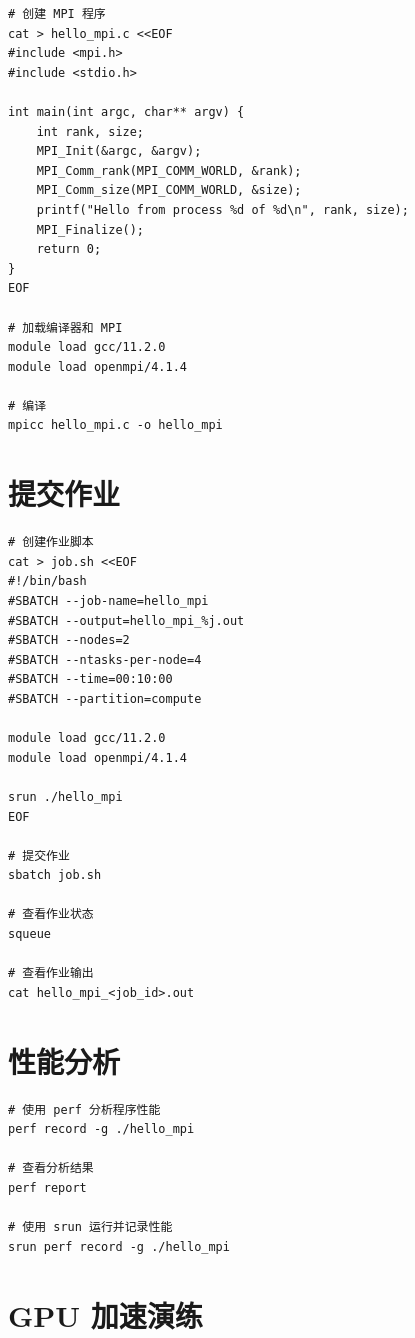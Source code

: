 \documentclass[12pt,UTF8]{ctexbook}
\begin{document}
\begin{verbatim}
# 创建 MPI 程序
cat > hello_mpi.c <<EOF
#include <mpi.h>
#include <stdio.h>

int main(int argc, char** argv) {
    int rank, size;
    MPI_Init(&argc, &argv);
    MPI_Comm_rank(MPI_COMM_WORLD, &rank);
    MPI_Comm_size(MPI_COMM_WORLD, &size);
    printf("Hello from process %d of %d\n", rank, size);
    MPI_Finalize();
    return 0;
}
EOF

# 加载编译器和 MPI
module load gcc/11.2.0
module load openmpi/4.1.4

# 编译
mpicc hello_mpi.c -o hello_mpi
\end{verbatim}

\section{提交作业}
\label{sec:practice_submit}

\begin{verbatim}
# 创建作业脚本
cat > job.sh <<EOF
#!/bin/bash
#SBATCH --job-name=hello_mpi
#SBATCH --output=hello_mpi_%j.out
#SBATCH --nodes=2
#SBATCH --ntasks-per-node=4
#SBATCH --time=00:10:00
#SBATCH --partition=compute

module load gcc/11.2.0
module load openmpi/4.1.4

srun ./hello_mpi
EOF

# 提交作业
sbatch job.sh

# 查看作业状态
squeue

# 查看作业输出
cat hello_mpi_<job_id>.out
\end{verbatim}

\section{性能分析}
\label{sec:practice_performance}

\begin{verbatim}
# 使用 perf 分析程序性能
perf record -g ./hello_mpi

# 查看分析结果
perf report

# 使用 srun 运行并记录性能
srun perf record -g ./hello_mpi
\end{verbatim}

\section{GPU 加速演练}
\label{sec:practice_gpu}
\end{document}
